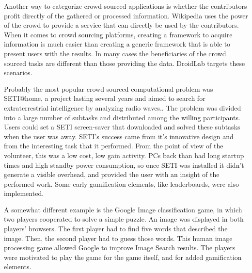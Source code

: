 \documentclass[conference,letterpaper]{IEEEtran}
\begin{document}
Another way to categorize crowd-sourced applications is whether the contributors profit directly of the gathered or processed information. Wikipedia uses the power of the crowd to provide a service that can directly be used by the contributors. When it comes to crowd sourcing platforms, creating a framework to acquire information is much easier than creating a generic framework that is able to present users with the results. In many cases the beneficiaries of the crowd sourced tasks are different than those providing the data. DroidLab targets these scenarios.

Probably the most popular crowd sourced computational problem was SETI@home, a project lasting several years and aimed to search for extraterrestrial intelligence by analyzing radio waves.. The problem was divided into a large number of subtasks and distributed among the willing participants. Users could set a SETI screen-saver that downloaded and solved these subtasks when the user was away. SETI's success came from it's innovative design and from the interesting task that it performed. From the point of view of the volunteer, this was a low cost, low gain activity. PCs back than had long startup times and high standby power consumption, so once SETI was installed it didn't generate a visible overhead, and provided the user with an insight of the performed work. Some early gamification elements, like leaderboards, were also implemented.

A somewhat different example is the Google Image classification game, in which two players cooperated to solve a simple puzzle. An image was displayed in both players' browsers. The first player had to find five words that described the image. Then, the second player had to guess those words. This human image processing game allowed Google to improve Image Search results. The players were motivated to play the game for the game itself, and for added gamification elements.
\end{document}
